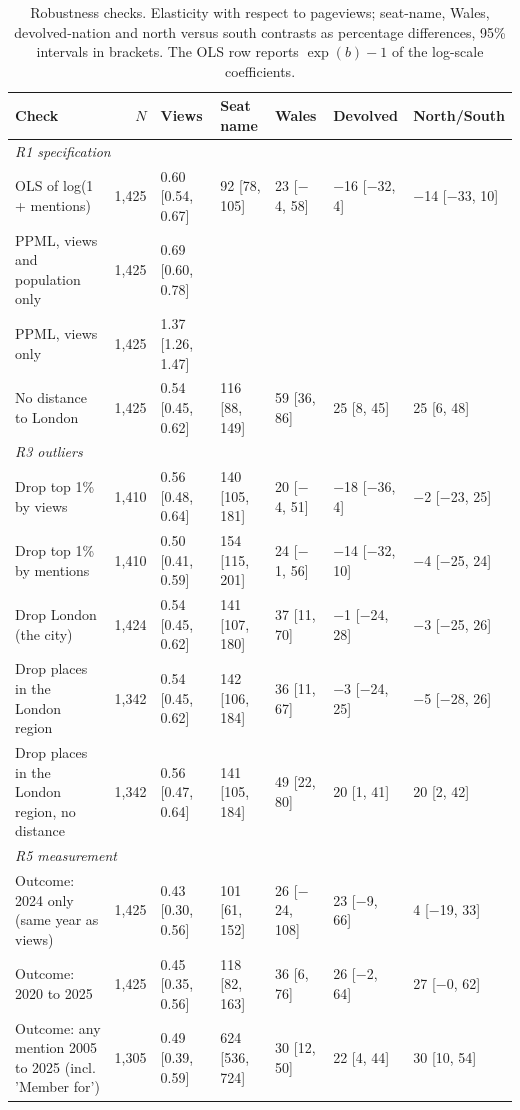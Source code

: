 \documentclass[11pt,a4paper]{article}
\begin{document}
\begin{table}[tbp]\centering\scriptsize\caption{Robustness checks. Elasticity with respect to pageviews; seat-name, Wales, devolved-nation and north versus south contrasts as percentage differences, 95\% intervals in brackets. The OLS row reports $\exp(b)-1$ of the log-scale coefficients.}\label{tab:robust}\setlength{\tabcolsep}{3pt}\begin{tabular}{p{5.3cm}rlllll}\toprule Check & $N$ & Views & Seat name & Wales & Devolved & North/South\\\midrule
\multicolumn{7}{l}{\textit{R1 specification}}\\
\quad OLS of log(1 + mentions) & 1,425 & 0.60 [0.54, 0.67] & 92 [78, 105] & 23 [$-$4, 58] & $-$16 [$-$32, 4] & $-$14 [$-$33, 10]\\
\quad PPML, views and population only & 1,425 & 0.69 [0.60, 0.78] &  &  &  & \\
\quad PPML, views only & 1,425 & 1.37 [1.26, 1.47] &  &  &  & \\
\quad No distance to London & 1,425 & 0.54 [0.45, 0.62] & 116 [88, 149] & 59 [36, 86] & 25 [8, 45] & 25 [6, 48]\\
\multicolumn{7}{l}{\textit{R3 outliers}}\\
\quad Drop top 1\% by views & 1,410 & 0.56 [0.48, 0.64] & 140 [105, 181] & 20 [$-$4, 51] & $-$18 [$-$36, 4] & $-$2 [$-$23, 25]\\
\quad Drop top 1\% by mentions & 1,410 & 0.50 [0.41, 0.59] & 154 [115, 201] & 24 [$-$1, 56] & $-$14 [$-$32, 10] & $-$4 [$-$25, 24]\\
\quad Drop London (the city) & 1,424 & 0.54 [0.45, 0.62] & 141 [107, 180] & 37 [11, 70] & $-$1 [$-$24, 28] & $-$3 [$-$25, 26]\\
\quad Drop places in the London region & 1,342 & 0.54 [0.45, 0.62] & 142 [106, 184] & 36 [11, 67] & $-$3 [$-$24, 25] & $-$5 [$-$28, 26]\\
\quad Drop places in the London region, no distance & 1,342 & 0.56 [0.47, 0.64] & 141 [105, 184] & 49 [22, 80] & 20 [1, 41] & 20 [2, 42]\\
\multicolumn{7}{l}{\textit{R5 measurement}}\\
\quad Outcome: 2024 only (same year as views) & 1,425 & 0.43 [0.30, 0.56] & 101 [61, 152] & 26 [$-$24, 108] & 23 [$-$9, 66] & 4 [$-$19, 33]\\
\quad Outcome: 2020 to 2025 & 1,425 & 0.45 [0.35, 0.56] & 118 [82, 163] & 36 [6, 76] & 26 [$-$2, 64] & 27 [$-$0, 62]\\
\quad Outcome: any mention 2005 to 2025 (incl. 'Member for') & 1,305 & 0.49 [0.39, 0.59] & 624 [536, 724] & 30 [12, 50] & 22 [4, 44] & 30 [10, 54]\\

\end{tabular}
\end{table}
\end{document}
